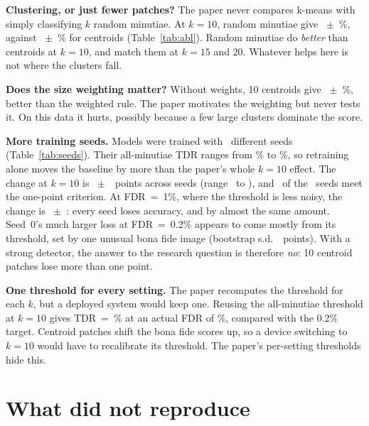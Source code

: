 \IfFileExists{IEEEtran.cls}{\documentclass[conference]{IEEEtran}}{\documentclass[twocolumn,10pt]{article}}
\begin{document}
\textbf{Clustering, or just fewer patches?} The paper never compares k-means with simply classifying $k$
random minutiae. At $k=10$, random minutiae give \TDRrandTen~$\pm$~\TDRrandTenSD\%, against
\TDRkTen~$\pm$~\TDRkTenSD\% for centroids (Table~\ref{tab:abl}). Random minutiae do \emph{better} than centroids at $k=10$, and match them at $k=15$ and 20. Whatever
helps here is not where the clusters fall.

\textbf{Does the size weighting matter?} Without weights, 10 centroids give
\TDRunwTen~$\pm$~\TDRunwTenSD\%, better than the weighted rule. The paper motivates the weighting but
never tests it. On this data it hurts, possibly because a few large clusters dominate the score.

\textbf{More training seeds.} Models were trained with \NSeeds\ different seeds (Table~\ref{tab:seeds}).
Their all-minutiae TDR ranges from \AllSeedsMin\% to \AllSeedsMax\%, so retraining alone moves the
baseline by more than the paper's whole $k=10$ effect. The change at $k=10$ is
\DeltaSeedsMean~$\pm$~\DeltaSeedsSD\ points across seeds (range \DeltaSeedsMin\ to \DeltaSeedsMax), and
\NSeedsPass\ of the \NSeeds\ seeds meet the one-point criterion. At FDR~=~1\%, where the threshold is less noisy, the change is \DeltaOneSeedsMean~$\pm$~\DeltaOneSeedsSD:
every seed loses accuracy, and by almost the same amount. Seed~0's much larger loss at FDR~=~0.2\% appears to
come mostly from its threshold, set by one unusual bona fide image (bootstrap s.d.\ \TDRallBootSD\ points).
With a strong detector, the answer to the research question is therefore \emph{no}: 10 centroid patches
lose more than one point.

\begin{table}[t]
\centering\caption{Per training seed. ``Fixed thr.'': the all-minutiae threshold reused at $k=10$
instead of recomputed, as stated in the proposal.}
\label{tab:seeds}\resizebox{\columnwidth}{!}{}
\end{table}

\textbf{One threshold for every setting.} The paper recomputes the threshold for each $k$, but a deployed
system would keep one. Reusing the all-minutiae threshold at $k=10$ gives TDR~=~\FixedTDRkTen\% at an
actual FDR of \FixedFDRkTen\%, compared with the 0.2\% target. Centroid patches shift the bona fide
scores up, so a device switching to $k=10$ would have to recalibrate its threshold. The paper's
per-setting thresholds hide this.

\section{What did not reproduce}
\end{document}
